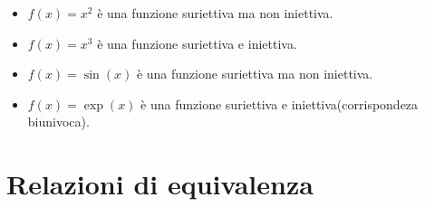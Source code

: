 \begin{esempio}
    \begin{itemize}
        \item $f(x)=x^2$ è una funzione suriettiva ma non iniettiva.
        \item $f(x)=x^3$ è una funzione suriettiva e iniettiva.
        \item $f(x)=\sin(x)$ è una funzione suriettiva ma non iniettiva.
        \item $f(x)=\exp(x)$ è una funzione suriettiva e iniettiva(corrispondeza biunivoca).
    \end{itemize}
\end{esempio}
\section{Relazioni di equivalenza}
         \label{sec:Relazioni_di_equivalenza} 

